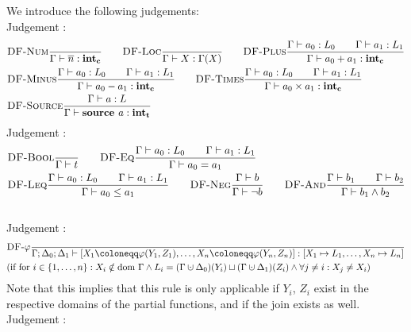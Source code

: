 We introduce the following judgements:
\\
Judgement :
\begin{align*}
    &\textsc{DF-Num}\frac{\displaystyle }{\displaystyle \Gamma \vdash {\overline{n}}: \textbf{int}_\textbf{c}}\qquad
    \textsc{DF-Loc}\frac{\displaystyle }{\displaystyle \Gamma \vdash {X}: \Gamma(X)}\qquad
    \textsc{DF-Plus}\frac{\displaystyle \Gamma \vdash {a_0}: L_0\qquad\Gamma \vdash {a_1}: L_1}{\displaystyle \Gamma \vdash {a_0+a_1}: \textbf{int}_\textbf{c}}\\
    &\textsc{DF-Minus}\frac{\displaystyle \Gamma \vdash {a_0}: L_0\qquad\Gamma \vdash {a_1}: L_1}{\displaystyle \Gamma \vdash {a_0-a_1}: \textbf{int}_\textbf{c}}\qquad
    \textsc{DF-Times}\frac{\displaystyle \Gamma \vdash {a_0}: L_0\qquad\Gamma \vdash {a_1}: L_1}{\displaystyle \Gamma \vdash {a_0 \times a_1}: \textbf{int}_\textbf{c}}\\
    &\textsc{DF-Source}\frac{\displaystyle \Gamma \vdash {a}: L}{\displaystyle \Gamma \vdash {\textbf{source }{a}}: \textbf{int}_\textbf{t}}\\
\end{align*}
Judgement :
\begin{align*}
    &\textsc{DF-Bool}\frac{\displaystyle }{\displaystyle \Gamma \vdash {t}}\qquad
    \textsc{DF-Eq}\frac{\displaystyle \Gamma \vdash {a_0}: L_0\qquad \Gamma \vdash {a_1}: L_1}{\displaystyle \Gamma \vdash {a_0 = a_1}}\\
    &\textsc{DF-Leq}\frac{\displaystyle \Gamma \vdash {a_0}: L_0\qquad \Gamma \vdash {a_1}: L_1}{\displaystyle \Gamma \vdash {a_0 \leq a_1}}\qquad
    \textsc{DF-Neg}\frac{\displaystyle \Gamma \vdash {b}}{\displaystyle \Gamma \vdash {\neg b}}\qquad
    \textsc{DF-And}\frac{\displaystyle \Gamma \vdash {b_1}\qquad\Gamma \vdash {b_2}}{\displaystyle \Gamma \vdash {b_1 \land b_2}}\\
\end{align*}
\\
Judgement :
\begin{align*}
    &\trule{DF-$\varphi$}{}{\typestep{\Gamma;\Delta_0;\Delta_1}{\defaultphilistn}{[X_1 \mapsto L_1, \ldots, X_n \mapsto L_n]}}\\
    &\text{(if for $i \in \{1, \ldots, n\}: X_i \notin \dom\Gamma \land L_i = (\Gamma \dunion \Delta_0)(Y_i) \join (\Gamma \dunion \Delta_1)(Z_i)
    \land \forall j \neq i: X_j \neq X_i$)}
\end{align*}
Note that this implies that this rule is only applicable if $Y_i$, $Z_i$ exist in the respective
domains of the partial functions, and if the join exists as well.\\
Judgement :
